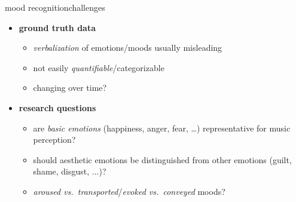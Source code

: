         \begin{frame}{mood recognition}{challenges}
            \begin{itemize}
                \item   \textbf{ground truth data}
                    \begin{itemize}
                        \item   \textit{verbalization} of emotions/moods usually misleading
                        \item   not easily \textit{quantifiable}/categorizable
                        \item   changing over time?
                    \end{itemize}
                \bigskip
                \item   \textbf{research questions}
                    \begin{itemize}
                        \item<2->	are \textit{basic emotions} (happiness, anger, fear, \ldots) representative for music perception?
                        \item<2->   should aesthetic emotions be distinguished from other emotions (guilt, shame, disgust, ...)?
                        \item<3->	\textit{aroused vs.\ transported}/\textit{evoked vs.\ conveyed} moods?
                    \end{itemize}
            \end{itemize}
        \end{frame}
                
